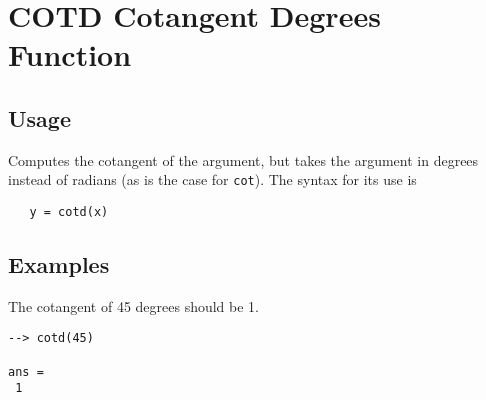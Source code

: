 \section{COTD Cotangent Degrees Function}

\subsection{Usage}

Computes the cotangent of the argument, but takes
the argument in degrees instead of radians (as is the case
for \verb|cot|). The syntax for its use is
\begin{verbatim}
   y = cotd(x)
\end{verbatim}
\subsection{Examples}

The cotangent of 45 degrees should be 1.
\begin{verbatim}
--> cotd(45)

ans = 
 1 
\end{verbatim}
